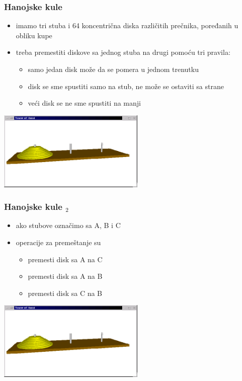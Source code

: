 \documentclass[utf8,compress]{beamer}
\begin{document}
\begin{frame}[fragile]
  \frametitle{Hanojske kule}
  \begin{itemize}
    \item imamo tri stuba i 64 koncentrična diska različitih prečnika, poređanih u obliku kupe
    \item treba premestiti diskove sa jednog stuba na drugi pomoću tri pravila:
  \begin{itemize}
    \item samo jedan disk može da se pomera u jednom trenutku
    \item disk se sme spustiti samo na stub, ne može se ostaviti sa strane
    \item veći disk se ne sme spustiti na manji
  \end{itemize}
  \end{itemize}
\begin{center}
  \includegraphics[width=7cm]{pic30}
\end{center}
\end{frame}

\begin{frame}[fragile]
  \frametitle{Hanojske kule $_2$}
  \begin{itemize}
    \item ako stubove označimo sa A, B i C
    \item operacije za premeštanje su
  \begin{itemize}
    \item premesti disk sa A na C
    \item premesti disk sa A na B
    \item premesti disk sa C na B
  \end{itemize}
  \end{itemize}
\begin{center}
  \includegraphics[width=7cm]{pic30}
\end{center}
\end{frame}
\end{document}
